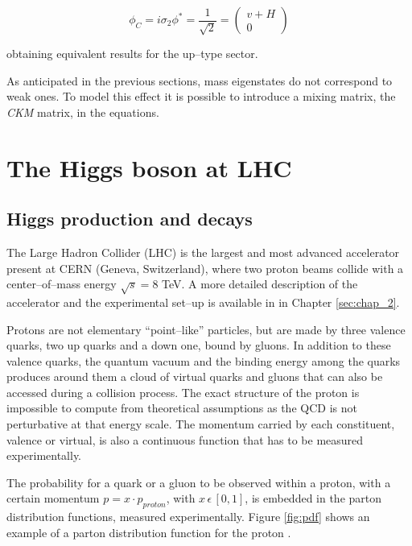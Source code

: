 \begin{equation}
\phi_C = i \sigma_2 \phi^{\ast} = \frac{1}{\sqrt{2}}=\begin{pmatrix}
v+H\\ 
0
\end{pmatrix}
\end{equation}

obtaining equivalent results for the up--type sector.

As anticipated in the previous sections, mass eigenstates do not correspond to weak ones. To model this effect it is possible to introduce a mixing matrix, the \emph{CKM} matrix, in the equations. 

\section{The Higgs boson at LHC}

\subsection{Higgs production and decays}

The Large Hadron Collider (LHC) is the largest and most advanced accelerator present at CERN (Geneva, Switzerland), where two proton beams collide with a center--of--mass energy $\sqrt{s} = 8$ TeV. A more detailed description of the accelerator and the experimental set--up is available in in Chapter \ref{sec:chap_2}.

Protons are not elementary ``point--like'' particles, but are made by three valence quarks, two up quarks and a down one, bound by gluons. In addition to these valence quarks, the quantum vacuum and the binding energy among the quarks produces around them a cloud of virtual quarks and gluons that can also be accessed during a collision process. The exact structure of the proton is impossible to compute from theoretical assumptions as the QCD is not perturbative at that energy scale. The momentum carried by each constituent, valence or virtual, is also a continuous function that has to be measured experimentally. 

The probability for a quark or a gluon to be observed within a proton, with a certain momentum $p = x \cdot p_{proton}$, with $x \, \epsilon \, [0,1]$, is embedded in the parton distribution functions, measured experimentally. Figure \ref{fig:pdf} shows an example of a parton distribution function for the proton \cite{Pumplin:2002vw}.

